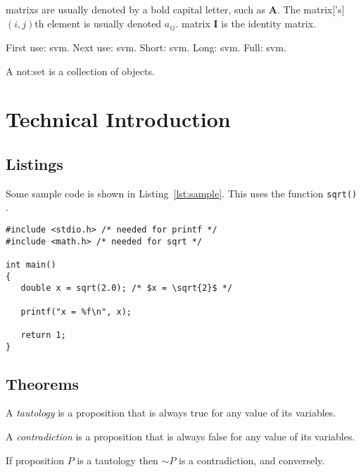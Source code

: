 \documentclass[oneside,12pt]{scrbook}
\theoremstyle{break}
\begin{document}
\Glspl{matrix} are usually denoted by a bold capital letter, such as
$\mathbf{A}$. The \gls{matrix}['s] $(i,j)$th element is usually
denoted $a_{ij}$. \Gls{matrix} $\mathbf{I}$ is the identity
\gls{matrix}. 

First use: \gls{svm}\@. Next use: \gls{svm}\@. Short:
\acrshort{svm}\@. Long: \acrlong{svm}. Full: \acrfull{svm}\@.

A \gls{not:set} is a collection of objects.

\chapter{Technical Introduction}
\label{ch:techintro}

\section{Listings}

Some sample code is shown in Listing~\ref{lst:sample}.  
This uses the function \lstinline"sqrt()"%
%
%
.

\begin{lstlisting}[mathescape=true,caption={Sample},label={lst:sample}]
#include <stdio.h> /* needed for printf */
#include <math.h> /* needed for sqrt */

int main()
{
   double x = sqrt(2.0); /* $x = \sqrt{2}$ */

   printf("x = %f\n", x);

   return 1;
}
\end{lstlisting} 

\section{Theorems}

\begin{Definition}[Tautology]
A \emph{tautology} is a proposition 
that is always true for any value of its variables.
\end{Definition}

\begin{Definition}[Contradiction]
A \emph{contradiction} is a 
proposition that is always false for any
value of its variables.
\end{Definition}

\begin{Theorem}
If proposition $P$ is a tautology
then $\sim P$ is a contradiction,
and conversely.
\end{Theorem}
\end{document}
